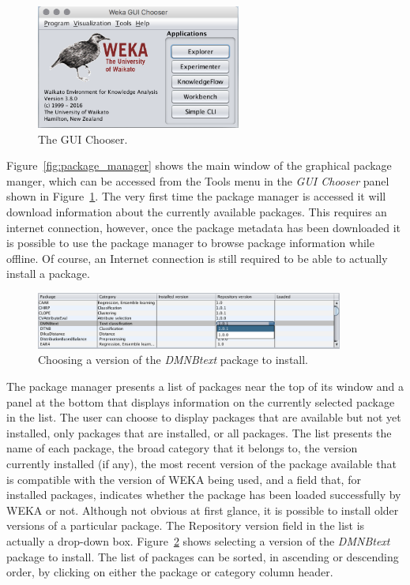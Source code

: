 \begin{figure}[!th]
\centering
\includegraphics[width=0.6\textwidth]{images/B_2_3a.png}
\caption{The GUI Chooser.}
\label{fig:gui_chooser}
\end{figure}

Figure~\ref{fig:package_manager} shows the main window of the
graphical package manger, which can be accessed from the Tools menu in
the \textit{GUI Chooser} panel shown in
Figure~\ref{fig:gui_chooser}. The very first time the package manager
is accessed it will download information about the currently available
packages. This requires an internet connection, however, once the
package metadata has been downloaded it is possible to use the package
manager to browse package information while offline. Of course, an
Internet connection is still required to be able to actually install a
package.

\begin{figure}[!th]
\centering
\includegraphics[width=0.9\textwidth]{images/P2.png}
\caption{Choosing a version of the \textit{DMNBtext} package to install.}
\label{fig:package_manager_2}
\end{figure}

The package manager presents a list of packages near the top of its
window and a panel at the bottom that displays information on the
currently selected package in the list. The user can choose to display
packages that are available but not yet installed, only packages that
are installed, or all packages. The list presents the name of each
package, the broad category that it belongs to, the version currently
installed (if any), the most recent version of the package available
that is compatible with the version of WEKA being used, and a field
that, for installed packages, indicates whether the package has been
loaded successfully by WEKA or not. Although not obvious at first
glance, it is possible to install older versions of a particular
package. The Repository version field in the list is actually a
drop-down box.  Figure~\ref{fig:package_manager_2} shows selecting a
version of the \textit{DMNBtext} package to install. The list of
packages can be sorted, in ascending or descending order, by clicking
on either the package or category column header.

